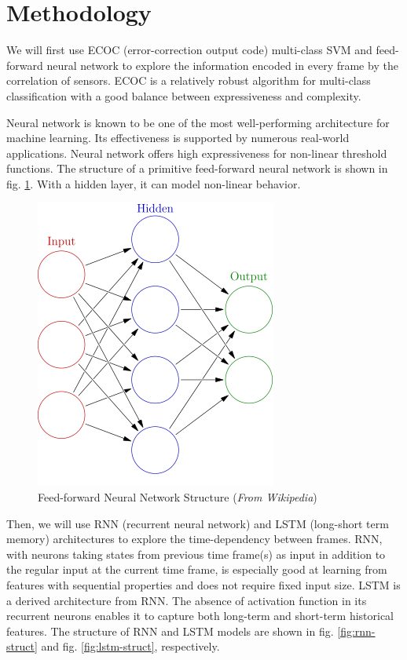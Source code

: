 \documentclass[letterpaper, 10pt, conference]{ieeeconf}
\begin{document}
\section{Methodology}

We will first use ECOC (error-correction output code) multi-class SVM and feed-forward neural network to explore the information encoded in every frame by the correlation of sensors. ECOC is a relatively robust algorithm for multi-class classification with a good balance between expressiveness and complexity. 

Neural network is known to be one of the most well-performing architecture for machine learning. Its effectiveness is supported by numerous real-world applications. Neural network offers high expressiveness for non-linear threshold functions. The structure of a primitive feed-forward neural network is shown in fig. \ref{fig:fnn-struct}. With a hidden layer, it can model non-linear behavior. 

\begin{figure}[h!]
    \centering
    \includegraphics[scale=0.5]{ffnn.png}
    \caption{Feed-forward Neural Network Structure (\textit{From Wikipedia})}
    \label{fig:fnn-struct}
\end{figure}

Then, we will use RNN (recurrent neural network) and LSTM (long-short term memory) architectures to explore the time-dependency between frames. RNN, with neurons taking states from previous time frame(s) as input in addition to the regular input at the current time frame, is especially good at learning from features with sequential properties and does not require fixed input size. LSTM is a derived architecture from RNN. The absence of activation function in its recurrent neurons enables it to capture both long-term and short-term historical features. The structure of RNN and LSTM models are shown in fig. \ref{fig:rnn-struct} and fig. \ref{fig:lstm-struct}, respectively. 
\end{document}
